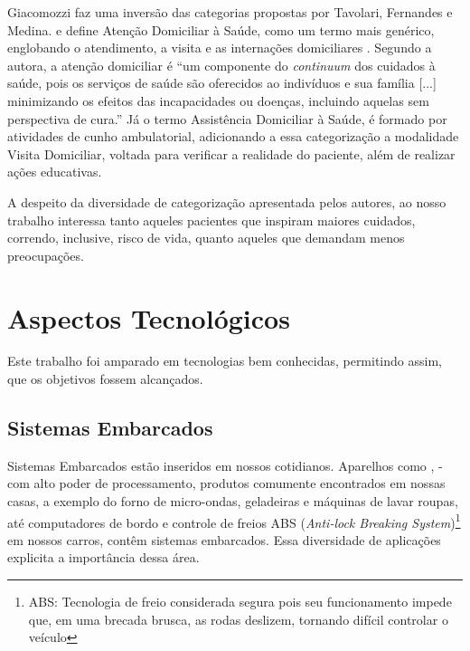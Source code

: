 
Giacomozzi faz uma inversão das categorias propostas por Tavolari, Fernandes e
Medina. e  define Atenção Domiciliar à Saúde, como um termo mais genérico,
englobando o atendimento, a visita e as internações domiciliares
\cite{giacomozzi2006pratica}. Segundo a autora, a atenção domiciliar é ``um
componente do \textit{continuum} dos cuidados à saúde, pois os serviços de saúde
são oferecidos ao indivíduos e sua família [...] minimizando os efeitos das
incapacidades ou doenças, incluindo aquelas sem perspectiva de cura.'' Já o
termo Assistência Domiciliar à Saúde, é formado por atividades de cunho
ambulatorial, adicionando a essa categorização a modalidade Visita Domiciliar,
voltada para verificar a realidade do paciente, além de realizar ações
educativas.

A despeito da diversidade de categorização apresentada pelos autores, ao nosso
trabalho interessa tanto aqueles pacientes que inspiram maiores cuidados,
correndo, inclusive, risco de vida, quanto aqueles que demandam menos
preocupações.

\section{Aspectos Tecnológicos}\label{sec:aspectos-tecnologicos}

Este trabalho foi amparado em tecnologias bem conhecidas, permitindo assim, 
que os objetivos fossem alcançados.

\subsection{Sistemas Embarcados}\label{subsec:sistemas-embarcados}

Sistemas Embarcados estão inseridos em nossos cotidianos. Aparelhos como
\smartphones[], \tablets[] - com alto poder de processamento,
produtos comumente encontrados em nossas casas, a exemplo do forno de 
micro-ondas, geladeiras e máquinas de lavar roupas, até computadores de bordo e
controle de freios ABS (\textit{Anti-lock Breaking System})\footnote{ABS:
Tecnologia  de freio considerada segura pois seu funcionamento impede que, em
uma brecada brusca, as rodas  deslizem, tornando difícil controlar o veículo} em
nossos carros, contêm sistemas embarcados. Essa diversidade de aplicações
explicita a importância dessa área.

